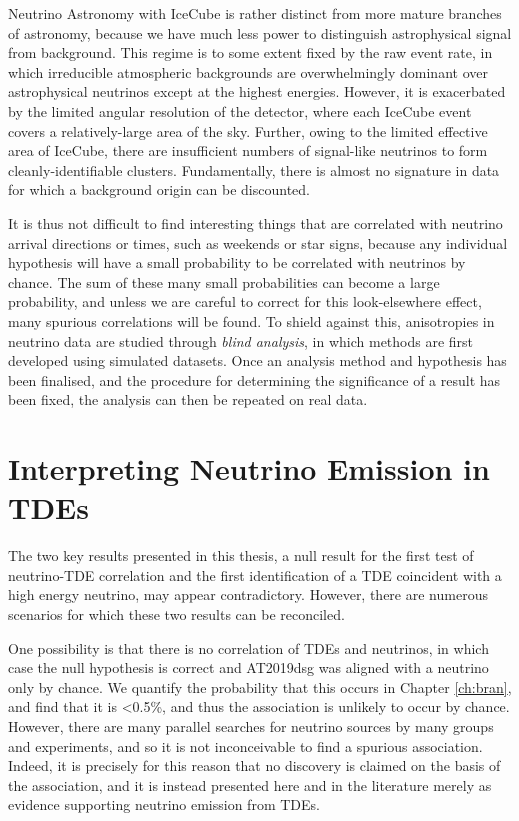 Neutrino Astronomy with IceCube is rather distinct from more mature branches of astronomy, because we have much less power to distinguish astrophysical signal from background. This regime is to some extent fixed by the raw event rate, in which irreducible atmospheric backgrounds are overwhelmingly dominant over astrophysical neutrinos except at the highest energies. However, it is exacerbated by the limited angular resolution of the detector, where each IceCube event covers a relatively-large area of the sky. Further, owing to the limited effective area of IceCube, there are insufficient numbers of signal-like neutrinos to form cleanly-identifiable clusters. Fundamentally, there is almost no signature in data for which a background origin can be discounted.

It is thus not difficult to find interesting things that are correlated with neutrino arrival directions or times, such as weekends or star signs, because any individual hypothesis will have a small probability to be correlated with  neutrinos by chance. The sum of these many small probabilities can become a large probability, and unless we are careful to correct for this look-elsewhere effect, many spurious correlations will be found. To shield against this, anisotropies in neutrino data are studied through \emph{blind analysis}, in which methods are first developed using simulated datasets. Once an analysis method and hypothesis has been finalised, and the procedure for determining the significance of a result has been fixed, the analysis can then be repeated on real data.

\section{Interpreting Neutrino Emission in TDEs}

The two key results presented in this thesis, a null result for the first test of neutrino-TDE correlation and the first identification of a TDE coincident with a high energy neutrino, may appear contradictory. However, there are numerous scenarios for which these two results can be reconciled. 

One possibility is that there is no correlation of TDEs and neutrinos, in which case the null hypothesis is correct and AT2019dsg was aligned with a neutrino only by chance. We quantify the probability that this occurs in Chapter \ref{ch:bran}, and find that it is <0.5\%, and thus the association is unlikely to occur by chance. However, there are many parallel searches for neutrino sources by many groups and experiments, and so it is not inconceivable to find a spurious association. Indeed, it is precisely for this reason that no discovery is claimed on the basis of the association, and it is instead presented here and in the literature merely as evidence supporting neutrino emission from TDEs.

